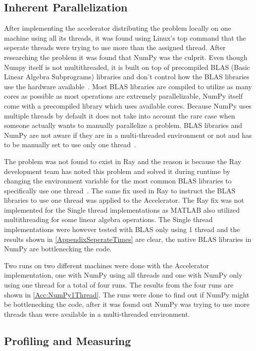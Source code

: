 \documentclass[12pt, a4paper]{article}
\begin{document}
\subsection{Inherent Parallelization}\label{inPara}

After implementing the accelerator distributing the problem locally on one machine using all its threads, it was found using Linux's top command that the seperate threads were trying to use more than the assigned thread.
After researching the problem it was found that NumPy was the culprit.
Even though Numpy itself is not multithreaded, it is built on top of precompiled BLAS (Basic Linear Algebra Subprograms) libraries and don't control how the BLAS libraries use the hardware available~\cite{Numpy:OpenBLAS}.
Most BLAS libraries are compiled to utilize as many cores as possible as most operations are extremely parallelizable, NumPy itself come with a precompiled library which uses available cores.
Because NumPy uses multiple threads by default it does not take into account the rare case when someone actually wants to manually parallelize a problem. 
BLAS libraries and NumPy are not aware if they are in a multi-threaded environment or not and has to be manually set to use only one thread~\cite{OpenBLAS:threadSafe}.

The problem was not found to exist in Ray and the reason is because the Ray development team has noted this problem and solved it during runtime by changing the environment variable for the most common BLAS libraries to specifically use one thread~\cite{ray:OMPNUMTHREAD}. 
The same fix used in Ray to instruct the BLAS libraries to use one thread was applied to the Accelerator.
The Ray fix was not implemented for the Single thread implementations as MATLAB also utilized multithreading for some linear algebra operations.
The Single thread implementations were however tested with BLAS only using 1 thread and the results shown in \cref{AppendixSeperateTimes} are clear, the native BLAS libraries in NumPy are bottlenecking the code.

Two runs on two different machines were done with the Accelerator implementation, one with NumPy using all threads and one with NumPy only using one thread for a total of four runs.
The results from the four runs are shown in \cref{Acc:NumPy1Thread}.
The runs were done to find out if NumPy might be bottlenecking the code, after it was found out NumPy was trying to use more threads than were available in a multi-threaded environment.

\subsection{Profiling and Measuring}
\end{document}
